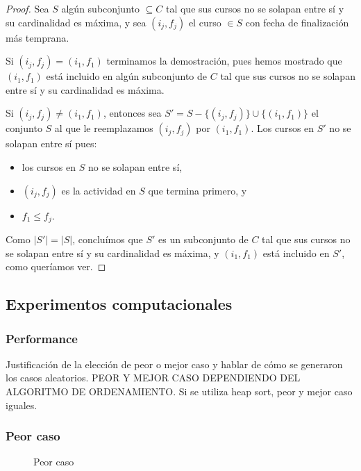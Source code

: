 \documentclass[a4paper, 10pt, twoside]{article}
\newcommand{\tresgraficos}[3]{
    \newcommand{\separacion}{-2.2em}
    \vspace{\separacion}
    
    \vspace{\separacion}
    
    \vspace{\separacion}
    
}
\begin{document}
\begin{proof}
    Sea $S$ algún subconjunto $\subseteq C$ tal que sus cursos no se solapan entre sí y su cardinalidad es máxima, y sea $(i_j, f_j)$ el curso $\in S$ con fecha de finalización más temprana.

    Si $(i_j, f_j) = (i_1, f_1)$ terminamos la demostración, pues hemos mostrado que $(i_1, f_1)$ está incluido en algún subconjunto de $C$ tal que sus cursos no se solapan entre sí y su cardinalidad es máxima.

    Si $(i_j, f_j) \neq (i_1, f_1)$, entonces sea $S' = S - \{ (i_j, f_j) \} \cup \{ (i_1, f_1) \}$ el conjunto $S$ al que le reemplazamos $(i_j, f_j)$ por $(i_1, f_1)$. Los cursos en $S'$ no se solapan entre sí pues:

    \begin{itemize}[nolistsep]
        \item{los cursos en $S$ no se solapan entre sí,}
        \item{$(i_j, f_j)$ es la actividad en $S$ que termina primero, y}
        \item{$f_1 \leq f_j$.}
    \end{itemize}

    Como $|S'| = |S|$, concluímos que $S'$ es un subconjunto de $C$ tal que sus cursos no se solapan entre sí y su cardinalidad es máxima, y $(i_1, f_1)$ está incluido en $S'$, como queríamos ver.
\end{proof}

\subsection{Experimentos computacionales}

\subsubsection{Performance}
Justificación de la elección de peor o mejor caso y hablar de cómo se generaron los casos aleatorios.
PEOR Y MEJOR CASO DEPENDIENDO DEL ALGORITMO DE ORDENAMIENTO.
Si se utiliza heap sort, peor y mejor caso iguales.

\subsubsection{Peor caso}

\begin{figure}[H]
  \centering
  \tresgraficos{problema2-peor-caso}
               {problema2-peor-caso-logn}
               {problema2-peor-caso-n}               
  \caption{Peor caso}
\end{figure}
\end{document}
